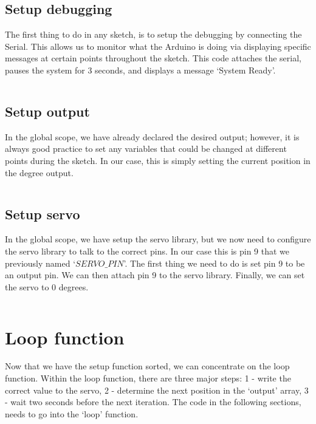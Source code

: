 \documentclass[11pt,a4paper]{article}
\begin{document}
\subsection{Setup debugging}
The first thing to do in any sketch, is to setup the debugging by connecting the Serial. This allows us to monitor what the Arduino is doing via displaying specific messages at certain points throughout the sketch. This code attaches the serial, pauses the system for 3 seconds, and displays a message `System Ready'.\\
\vspace{-1.75em}
\inputminted{arduino}{./src/3-setup-debug.txt}
\vspace{-.5em}

\subsection{Setup output}
In the global scope, we have already declared the desired output; however, it is always good practice to set any variables that could be changed at different points during the sketch. In our case, this is simply setting the current position in the degree output.\\

\vspace{-1.75em}
\inputminted{arduino}{./src/4-setup-output.txt}
\vspace{-.5em}

\subsection{Setup servo}
In the global scope, we have setup the servo library, but we now need to configure the servo library to talk to the correct pins. In our case this is pin 9 that we previously named `$SERVO\_PIN$'. The first thing we need to do is set pin 9 to be an output pin. We can then attach pin 9 to the servo library. Finally, we can set the servo to 0 degrees.\\

\vspace{-1.75em}
\inputminted{arduino}{./src/5-setup-servo.txt}
\vspace{-.5em}

\section{Loop function}
Now that we have the setup function sorted, we can concentrate on the loop function. Within the loop function, there are three major steps: 1 - write the correct value to the servo, 2 - determine the next position in the `output' array, 3 - wait two seconds before the next iteration. The code in the following sections, needs to go into the `loop' function.\\
\end{document}
